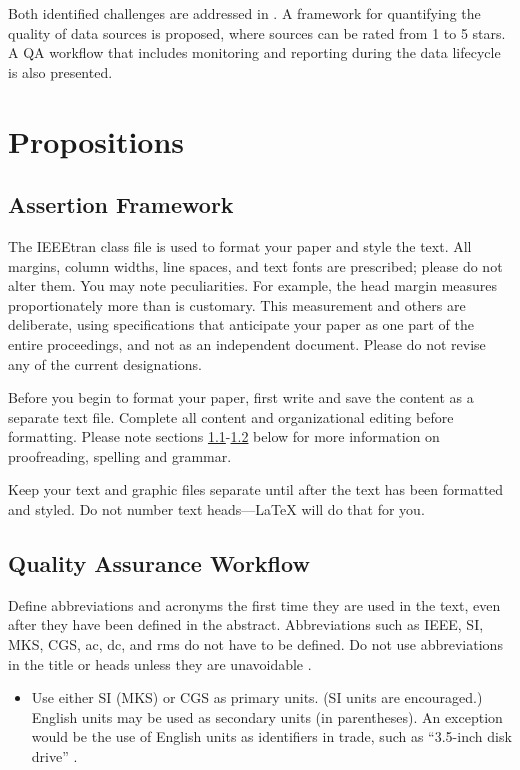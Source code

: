 \documentclass[conference]{IEEEtran}
\begin{document}
Both identified challenges are addressed in \cite{wagner2022quality}. A framework for quantifying the quality of data sources is proposed, where sources can be rated from 1 to 5 stars. A QA workflow that includes monitoring and reporting during the data lifecycle is also presented.

\section{Propositions}

\subsection{Assertion Framework} \label{AF}

The IEEEtran class file is used to format your paper and style the text. All margins, 
column widths, line spaces, and text fonts are prescribed; please do not 
alter them. You may note peculiarities. For example, the head margin
measures proportionately more than is customary. This measurement 
and others are deliberate, using specifications that anticipate your paper 
as one part of the entire proceedings, and not as an independent document. 
Please do not revise any of the current designations.

Before you begin to format your paper, first write and save the content as a 
separate text file. Complete all content and organizational editing before 
formatting. Please note sections \ref{AF}-\ref{QAW} below for more information on 
proofreading, spelling and grammar.

Keep your text and graphic files separate until after the text has been 
formatted and styled. Do not number text heads---{\LaTeX} will do that 
for you.

\subsection{Quality Assurance Workflow}\label{QAW}
Define abbreviations and acronyms the first time they are used in the text, 
even after they have been defined in the abstract. Abbreviations such as 
IEEE, SI, MKS, CGS, ac, dc, and rms do not have to be defined. Do not use 
abbreviations in the title or heads unless they are unavoidable \cite{wagner2022quality}.

\begin{itemize}
\item Use either SI (MKS) or CGS as primary units. (SI units are encouraged.) English units may be used as secondary units (in parentheses). An exception would be the use of English units as identifiers in trade, such as ``3.5-inch disk drive'' \cite{sjr}.
\end{itemize}
\end{document}
